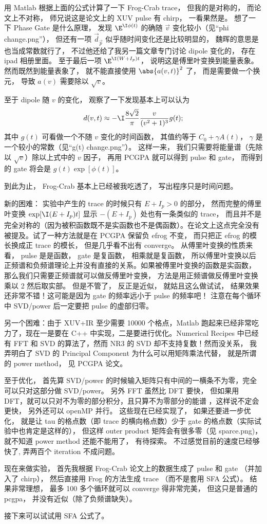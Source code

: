 用 Matlab 根据上面的公式计算了一下 Frog-Crab trace， 但我的是对称的， 而论文上不对称， 师兄说这是论文上的 XUV pulse 有 chirp， 一看果然是。 想了一下 Phase Gate 是什么原理， 发现 $\E^{\I\phi(t)}$ 的确随 $\vec v$ 变化较小（见“phi change.png”）， 但还有一项 $\vec d_{\vec p}$ 似乎随时间变化还是比较明显的， 魏晖的意思是也当成常数就行了， 不过他还给了我另一篇文章专门讨论 dipole 变化的， 存在 ipad 相册里面。 至于最后一项 $\E^{\I(W+I_p)t}$， 说明这是傅里叶变换到能量表象。然而既然到能量表象了， 就不能直接使用 $\abs{a(v, t)}^2$ 了， 而是需要做一个换元， 导致 $a(v)$ 需要除以 $\sqrt{v}$。

至于 dipole 随 $v$ 的变化， 观察了一下发现基本上可以认为
\begin{equation}
d(v, t) \approx -\I \frac{8\sqrt2}{\pi} \frac{v}{(v^2+1)^3} g(t);
\end{equation}
其中 $g(t)$ 可看做一个不随 $v$ 变化的时间函数， 其值约等于 $C_0 + \gamma A(t)$， $\gamma$ 是一个较小的常数（见“g(t) change.png”）。 这样一来， 我们只需要将能量谱（先除以 $\sqrt{v}$）除以上式中的 $v$ 因子， 再用 PCGPA 就可以得到 pulse 和 gate， 而得到的 gate 将会是 $g(t)\exp[\phi(t)]$。

到此为止， Frog-Crab 基本上已经被我吃透了， 写出程序只是时间问题。

新的困难： 实验中产生的 trace 的时候只有 $E + I_p > 0$ 的部分， 然而完整的傅里叶变换  $\exp[\I (E + I_p) t]$ 显示 $-(E + I_p)$ 处也有一条类似的 trace， 而且并不是完全对称的（因为被积函数既不是实函数也不是偶函数）。在论文上这点完全没有被提及。试了一种方法就是在 PCGPA 保留负 efrog 不变， 而只把正 efrog 的模长换成正 trace 的模长， 但是几乎看不出有 converge。 从傅里叶变换的性质来看， pulse 是是函数， gate 是复函数， 相乘就是复函数， 所以傅里叶变换以后正频谱和负频谱理论上并没有直接的关系。如果被傅里叶变换的函数是实函数， 那么我们只需要正频谱就可以做反傅里叶变换， 方法是用正频谱做反傅里叶变换乘以 2 然后取实部。 但是不管了， 反正是近似， 就姑且这么做试试， 结果效果还非常不错！这可能是因为 gate 的频率远小于 pulse 的频率吧！ 注意在每个循环中 SVD/power 后一定要把 pulse 的虚部归零。

另一个困难：由于 XUV+IR 至少需要 10000 个格点，Matlab 跑起来已经非常吃力了，现在一是要在 C++ 中实现，二是要进行优化。Numerical Recipes 中已经有 FFT 和 SVD 的算法了，然而 NR3 的 SVD 却不支持复数！然而没关系， 我弄明白了 SVD 的 Principal Component 为什么可以用矩阵乘法代替， 就是所谓的 power method， 见 PCGPA 论文。

至于优化， 首先算 SVD/power 的时候输入矩阵只有中间的一横条不为零，完全可以只对这部分做 SVD/power。 另外 FFT 虽然比 DFT 要快， 但如果用 DFT，就可以只对不为零的部分积分，且只算不为零部分的能谱 ，这样说不定会更快， 另外还可以 openMP 并行。 这些现在已经实现了， 如果还要进一步优化， 就是让 tau 的格点数（即 trace 的横向格点数）少于 gate 的格点数（实际试验中也肯定是这样的）， 但这样 outer product 矩阵会有很多零（见 sparce.png)， 就不知道 power method 还能不能用了， 有待探索。 不过感觉目前的速度已经够快了, 弄两百个 iteration 不成问题。

现在来做实验， 首先我根据 Frog-Crab 论文上的数据生成了 pulse 和 gate （并加入了 chirp）， 然后直接用 Frog 的方法生成 trace （而不是套用 SFA 公式）。 结果非常理想， 最多 100 多个循环就可以 converge 得非常完美， 但这只是普通的 pcgpa， 并没有近似（除了负频谱缺失）。

接下来可以试试用 SFA 公式了。








